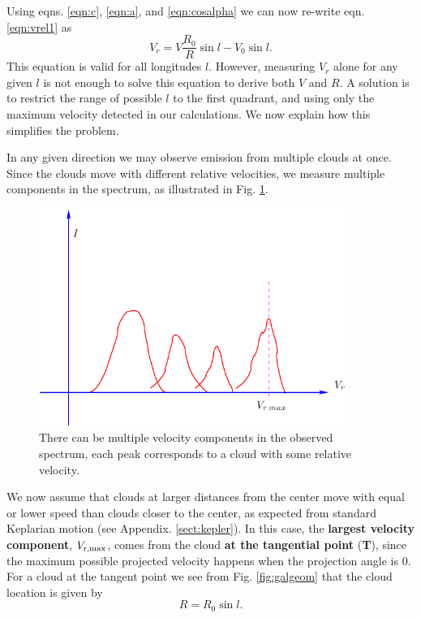 Using eqns. \ref{eqn:c}, \ref{eqn:a}, and \ref{eqn:cosalpha} we can now
re-write eqn. \ref{eqn:vrel1} as
\begin{equation}
\boxed{V_r = V \frac{R_0}{R}\sin l - V_0 \sin l .}
\label{eqn:vrel2}
\end{equation}
This equation is valid for all longitudes $l$. However, measuring $V_r$ alone for any given $l$
is not enough to solve this equation to derive both $V$ and $R$. A solution is to restrict
the range of possible $l$ to the first quadrant, and using only the maximum velocity detected
in our calculations. We now explain how this simplifies the problem. 

In any given direction we may observe emission from multiple clouds at once. Since the clouds
move with different relative velocities, we measure multiple components in the spectrum, as illustrated
in Fig. \ref{fig:vmax}. 
\begin{figure}[ht]
\begin{center}
\includegraphics[width=10cm]{../figures/vmax.pdf}
\end{center}
\caption{There can be multiple velocity components in the observed spectrum, each peak corresponds
to a cloud with some relative velocity.}
\label{fig:vmax}
\end{figure}
We now assume that clouds at larger distances from the center move with equal
or lower speed than clouds closer to the center, as expected from standard
Keplarian motion (see Appendix. \ref{sect:kepler}).  In this case, the {\bf
largest velocity component}, $V_{\rm r,max}$, comes from the cloud {\bf at the
tangential point} ({\bf T}), since the maximum possible projected velocity
happens when the projection angle is 0.  For a cloud at the tangent point we
see from Fig. \ref{fig:galgeom} that the cloud location is given by 
\begin{equation}
	R = R_0 \sin l.
	\label{eqn:rotR}
\end{equation}

